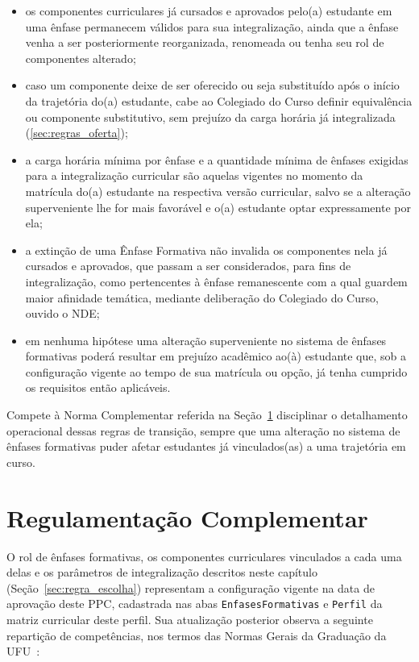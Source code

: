 \begin{itemize}
    \item os componentes curriculares já cursados e aprovados pelo(a) estudante em uma ênfase permanecem válidos para sua integralização, ainda que a ênfase venha a ser posteriormente reorganizada, renomeada ou tenha seu rol de componentes alterado;
    \item caso um componente deixe de ser oferecido ou seja substituído após o início da trajetória do(a) estudante, cabe ao Colegiado do Curso definir equivalência ou componente substitutivo, sem prejuízo da carga horária já integralizada (\autoref{sec:regras_oferta});
    \item a carga horária mínima por ênfase e a quantidade mínima de ênfases exigidas para a integralização curricular são aquelas vigentes no momento da matrícula do(a) estudante na respectiva versão curricular, salvo se a alteração superveniente lhe for mais favorável e o(a) estudante optar expressamente por ela;
    \item a extinção de uma Ênfase Formativa não invalida os componentes nela já cursados e aprovados, que passam a ser considerados, para fins de integralização, como pertencentes à ênfase remanescente com a qual guardem maior afinidade temática, mediante deliberação do Colegiado do Curso, ouvido o NDE;
    \item em nenhuma hipótese uma alteração superveniente no sistema de ênfases formativas poderá resultar em prejuízo acadêmico ao(à) estudante que, sob a configuração vigente ao tempo de sua matrícula ou opção, já tenha cumprido os requisitos então aplicáveis.
\end{itemize}

Compete à Norma Complementar referida na Seção~\ref{sec:enfases_norma_complementar} disciplinar o detalhamento operacional dessas regras de transição, sempre que uma alteração no sistema de ênfases formativas puder afetar estudantes já vinculados(as) a uma trajetória em curso.

\section{Regulamentação Complementar}
\label{sec:enfases_norma_complementar}

O rol de ênfases formativas, os componentes curriculares vinculados a cada uma delas e os parâmetros de integralização descritos neste capítulo (Seção~\ref{sec:regra_escolha}) representam a configuração vigente na data de aprovação deste PPC, cadastrada nas abas \texttt{EnfasesFormativas} e \texttt{Perfil} da matriz curricular deste perfil. Sua atualização posterior observa a seguinte repartição de competências, nos termos das Normas Gerais da Graduação da UFU~\cite{ufu_congrad_46_2022}:

